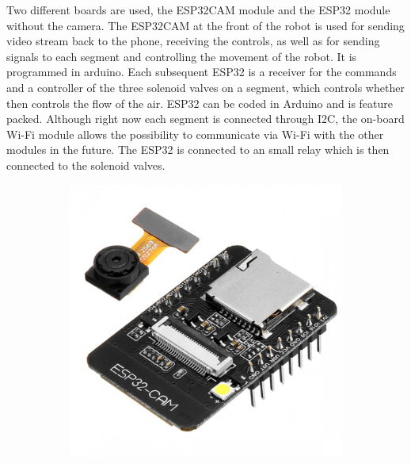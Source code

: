 \documentclass[twoside]{article}
\begin{document}
Two different boards are used, the ESP32CAM module and the ESP32 module without the camera. The ESP32CAM at the front of the robot is used for sending video stream back to the phone, receiving the controls, as well as for sending signals to each segment and controlling the movement of the robot. It is programmed in arduino. Each subsequent ESP32 is a receiver for the commands and a controller of the three solenoid valves on a segment, which controls whether then controls the flow of the air. ESP32 can be coded in Arduino and is feature packed. Although right now each segment is connected through I2C, the on-board Wi-Fi module allows the possibility to communicate via Wi-Fi with the other modules in the future. The ESP32 is connected to an small relay which is then connected to the solenoid valves. 

\begin{figure}[H]
	\centering
	\begin{subfigure}[b]{0.33\linewidth}
		\centering
		\includegraphics[width=\textwidth]{esp32cam}
	\end{subfigure}%
	\begin{subfigure}[b]{0.33\linewidth}
		\centering		

\end{subfigure}
\end{figure}
\end{document}
